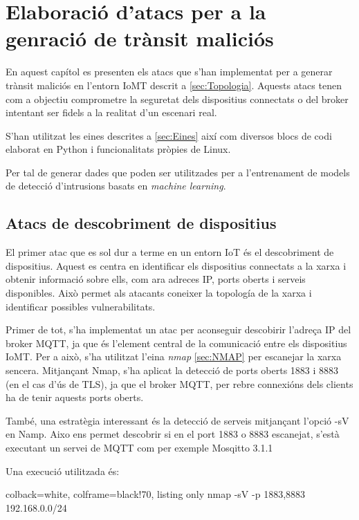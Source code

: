 \chapter{Elaboració d'atacs per a la genració de trànsit maliciós}

En aquest capítol es presenten els atacs que s'han implementat per a generar trànsit maliciós en l'entorn IoMT descrit a \ref{sec:Topologia}. Aquests atacs tenen com a objectiu comprometre la seguretat dels dispositius connectats o del broker intentant ser fidels a la realitat d'un escenari real. 

S'han utilitzat les eines descrites a \ref{sec:Eines} així com diversos blocs de codi elaborat en Python i funcionalitats pròpies de Linux. 


Per tal de generar dades que poden ser utilitzades per a l'entrenament de models de detecció d'intrusions basats en \textit{machine learning}.



\section{Atacs de descobriment de dispositius}

El primer atac que es sol dur a terme en un entorn IoT és el descobriment de dispositius. Aquest es centra en identificar els dispositius connectats a la xarxa i obtenir informació sobre ells, com ara adreces IP, ports oberts i serveis disponibles. Això permet als atacants coneixer la topología de la xarxa i identificar possibles vulnerabilitats.

Primer de tot, s'ha implementat un atac per aconseguir descobirir l'adreça IP del broker MQTT, ja que és l'element central de la comunicació entre els dispositius IoMT. Per a això, s'ha utilitzat l'eina \textit{nmap} \ref{sec:NMAP} per escanejar la xarxa sencera. Mitjançant Nmap, s'ha aplicat la detecció de ports oberts 1883 i 8883 (en el cas d'ús de TLS), ja que el broker MQTT, per rebre connexións dels clients ha de tenir aquests ports oberts. 

També, una estratègia interessant és la detecció de serveis mitjançant l'opció -sV en Namp. Aixo ens permet descobrir si en el port 1883 o 8883 escanejat, s'està executant un servei de MQTT com per exemple Mosqitto 3.1.1

Una execució utilitzada és: 
\begin{tcblisting}{colback=white, colframe=black!70, listing only}
    nmap -sV -p 1883,8883 192.168.0.0/24
\end{tcblisting}

